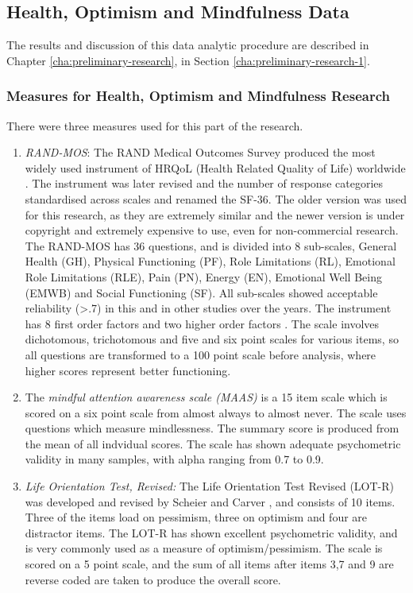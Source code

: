 \subsection{Health, Optimism and Mindfulness Data}

The results and discussion of this data analytic procedure are described in Chapter \ref{cha:preliminary-research}, in Section \ref{cha:preliminary-research-1}.

\subsubsection{Measures for Health, Optimism and Mindfulness Research}

There were three measures used for this part of the research.
\begin{enumerate}
\item \textit{RAND-MOS}: The RAND Medical Outcomes Survey produced the most widely used instrument of HRQoL (Health Related Quality of Life) worldwide \cite{hays1993rand}. The instrument was later revised and the number of response categories standardised across scales and renamed the SF-36. The older version was used for this research, as they are extremely similar and the newer version is under copyright and extremely expensive to use, even for non-commercial research. The RAND-MOS has 36 questions, and is divided into 8 sub-scales, General Health (GH),
Physical Functioning (PF), Role Limitations (RL), Emotional Role Limitations
(RLE), Pain (PN), Energy (EN), Emotional Well Being (EMWB) and Social
Functioning (SF). All sub-scales showed acceptable reliability
(>.7) in this and in other studies over the years\cite{Lam2007,Ferreira2000}.
The instrument has 8 first order factors and two higher order factors
\cite{Hann2008}. The scale involves dichotomous, trichotomous and
five and six point scales for various items, so all questions are
transformed to a 100 point scale before analysis, where higher scores
represent better functioning.
\item The \textit{mindful attention awareness scale (MAAS)}
\cite{brown2003benefits} is a 15 item scale which is scored on
a six point scale from almost always to almost never. The scale uses
questions which measure mindlessness. The summary score is produced
from the mean of all indvidual scores. The scale has shown adequate
psychometric validity in many samples, with alpha ranging from 0.7
to 0.9\cite{brown2003benefits,Ruth2006}.
\item \textit{Life Orientation Test, Revised:} The Life Orientation Test Revised (LOT-R) was developed and revised
by Scheier and Carver \cite{Scheier1994}, and consists of 10 items.
Three of the items load on pessimism, three on optimism and four are
distractor items. The LOT-R has shown excellent psychometric validity,
and is very commonly used as a measure of optimism/pessimism. The
scale is scored on a 5 point scale,
and the sum of all items after items 3,7 and 9 are reverse coded are taken to produce the overall score.
\end{enumerate}



